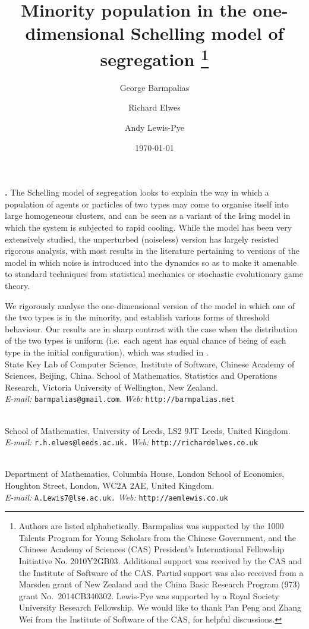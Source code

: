 \documentclass[11pt]{article}
\title{Minority
population in the one-dimensional 
Schelling  model of segregation
\thanks{Authors are listed alphabetically. 
Barmpalias was supported by the 
1000 Talents Program for Young Scholars from the Chinese Government,
and the Chinese Academy of Sciences (CAS) President's International 
Fellowship Initiative No. 2010Y2GB03.
Additional support was received by
the CAS and the Institute of Software of the CAS.
Partial support was also received from a Marsden grant of New Zealand 
and the China Basic Research Program (973) grant No.~2014CB340302.
Lewis-Pye was supported by a Royal Society University 
Research Fellowship. We would like to thank Pan Peng and Zhang Wei 
from the Institute of Software of the CAS, for helpful discussions.}}
\author{George Barmpalias  \and Richard Elwes \and	Andy Lewis-Pye}
\date{\today}
\theoremstyle{plain}
\numberwithin{equation}{subsection}
\renewenvironment{abstract}
 { \normalsize
  \list{}{
    \setlength{\leftmargin}{.0cm}\setlength{\rightmargin}{\leftmargin}}\item {\bf \abstractname.} \relax}
 {\endlist}
\begin{document}
\maketitle


\begin{abstract}
The Schelling model of segregation looks to explain the way in which a population of agents or particles of two types may come to organise itself into large homogeneous clusters, and can be seen as a variant of the Ising model in which the system is subjected to rapid cooling.  
While the model has been very extensively studied, the unperturbed (noiseless) version has largely resisted rigorous analysis, with most results in the literature pertaining to versions of the model in which noise is introduced into the dynamics so as to make it amenable to standard techniques from statistical mechanics or stochastic evolutionary game theory. 

We rigorously analyse the one-dimensional version of the model in 
which one of the two types is in the minority, and establish various forms of threshold behaviour. 
 Our  results are in sharp contrast with the case when the distribution of the two types
is uniform (i.e.\ each agent has equal chance of being of each type in the initial configuration), which was studied in
\cite{brandt:an, BELschel13}. 
\end{abstract}
\vspace*{\fill}
\\[0.5em]
\noindent State Key Lab of Computer Science, 
Institute of Software, Chinese Academy of Sciences, Beijing, China.
School of Mathematics, Statistics and Operations Research,
Victoria University of Wellington, New Zealand.\\[0.2em] 
\textit{E-mail:} \texttt{\textcolor{dnrgr}{barmpalias@gmail.com}}.
\textit{Web:} \texttt{\textcolor{dnrre}{http://barmpalias.net}}\par
\addvspace{\medskipamount}
\\[0.5em]
\noindent School of Mathematics,
University of Leeds, LS2 9JT Leeds, United Kingdom.\\[0.2em]
\textit{E-mail:} \texttt{\textcolor{dnrgr}{r.h.elwes@leeds.ac.uk.}}
\textit{Web:} \texttt{\textcolor{dnrre}{http://richardelwes.co.uk}}\par
\addvspace{\medskipamount}
\\[0.5em]  
\noindent Department of Mathematics,
Columbia House, London School of Economics, 
Houghton Street, London, WC2A 2AE, United Kingdom.\\[0.2em]
\textit{E-mail:} \texttt{\textcolor{dnrgr}{A.Lewis7@lse.ac.uk.}}
\textit{Web:} \texttt{\textcolor{dnrre}{http://aemlewis.co.uk}} 
\vfill \thispagestyle{empty}
\clearpage
\end{document}
